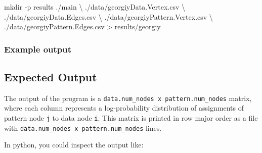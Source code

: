 \documentclass[10pt,oneside]{memoir}
\newenvironment{Shaded}{}{}
\newcommand{\ExtensionTok}[1]{#1}
\newcommand{\FunctionTok}[1]{\textcolor[rgb]{0.02,0.16,0.49}{#1}}
\newcommand{\KeywordTok}[1]{\textcolor[rgb]{0.00,0.44,0.13}{\textbf{#1}}}
\newcommand{\NormalTok}[1]{#1}
\newcommand{\OperatorTok}[1]{\textcolor[rgb]{0.40,0.40,0.40}{#1}}
\begin{document}
\begin{Shaded}
\begin{Highlighting}[]
\FunctionTok{mkdir}\NormalTok{ -p results}
\ExtensionTok{./main}\NormalTok{ \textbackslash{}}
\NormalTok{    ./data/georgiyData.Vertex.csv \textbackslash{}}
\NormalTok{    ./data/georgiyData.Edges.csv \textbackslash{}}
\NormalTok{    ./data/georgiyPattern.Vertex.csv \textbackslash{}}
\NormalTok{    ./data/georgiyPattern.Edges.csv }\OperatorTok{>}\NormalTok{ results/georgiy}
\end{Highlighting}
\end{Shaded}

\hypertarget{example-output}{%
\subsubsection{Example output}\label{example-output}}

\begin{Shaded}
\end{Shaded}

\hypertarget{expected-output}{%
\subsection{Expected Output}\label{expected-output}}

The output of the program is a
\texttt{data.num\_nodes\ x\ pattern.num\_nodes} matrix, where each
column represents a log-probability distribution of assignments of
pattern node \texttt{j} to data node \texttt{i}. This matrix is printed
in row major order as a file with
\texttt{data.num\_nodes\ x\ pattern.num\_nodes} lines.

In python, you could inspect the output like:
\end{document}
